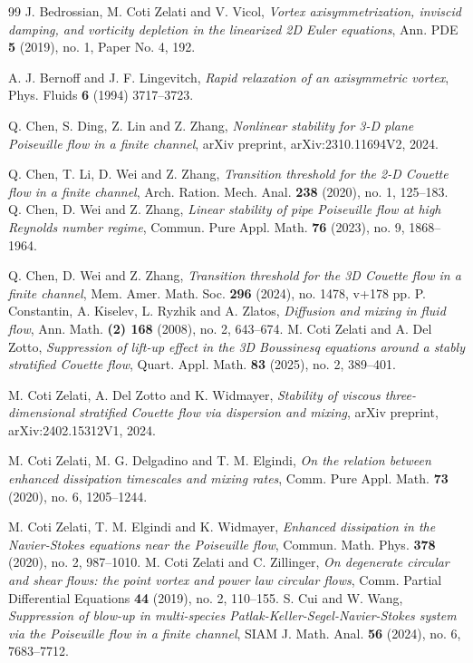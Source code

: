 \documentclass[reqno, 12pt]{amsart} %
\theoremstyle{plain} %
\theoremstyle{definition}
\theoremstyle{remark}
\numberwithin{equation}{section} %
\begin{document}
\begin{thebibliography}{99}
		J. Bedrossian, M. Coti Zelati and V. Vicol, 
		\textit{Vortex axisymmetrization, inviscid damping, and vorticity depletion in the linearized 2D Euler equations}, 
		Ann. PDE \textbf{5} (2019), no. 1, Paper No. 4, 192.
		
		A. J. Bernoff and J. F. Lingevitch, 
		\textit{Rapid relaxation of an axisymmetric vortex}, 
		Phys. Fluids \textbf{6} (1994) 3717–3723.
		
		Q. Chen, S. Ding, Z. Lin and Z. Zhang, 
		\textit{Nonlinear stability for 3-D plane Poiseuille flow in a finite channel}, 
		arXiv preprint, arXiv:2310.11694V2, 2024.
		
		Q. Chen, T. Li, D. Wei and Z. Zhang, 
		\textit{Transition threshold for the 2-D Couette flow in a finite channel}, 
		Arch. Ration. Mech. Anal. \textbf{238} (2020), no. 1, 125–183.
		Q. Chen, D. Wei and Z. Zhang, 
		\textit{Linear stability of pipe Poiseuille flow at high Reynolds number regime}, 
		Commun. Pure Appl. Math. \textbf{76}  (2023), no. 9, 1868–1964.
		
		Q. Chen, D. Wei and Z. Zhang, 
		\textit{Transition threshold for the 3D Couette flow in a finite channel}, 
		Mem. Amer. Math. Soc. \textbf{296} (2024), no. 1478, v+178 pp.
		P. Constantin, A. Kiselev, L. Ryzhik and A. Zlatos, 
		\textit{Diffusion and mixing in fluid flow}, 
		Ann. Math. \textbf{(2) 168} (2008), no. 2, 643–674. 
		M. Coti Zelati and A. Del Zotto, 
		\textit{Suppression of lift-up effect in the 3D Boussinesq equations around a stably stratified Couette flow}, 
		Quart. Appl. Math. \textbf{83} (2025), no. 2, 389–401.
		
		M. Coti Zelati, A. Del Zotto and K. Widmayer, 
		\textit{Stability of viscous three-dimensional stratified Couette flow via dispersion and mixing}, arXiv preprint, arXiv:2402.15312V1, 2024.
		
		M. Coti Zelati, M. G. Delgadino and T. M. Elgindi, 
		\textit{On the relation between enhanced dissipation timescales and mixing rates}, 
		Comm. Pure Appl. Math. \textbf{73} (2020), no. 6, 1205–1244.
		
		M. Coti Zelati, T. M. Elgindi and K. Widmayer, 
		\textit{Enhanced dissipation in the Navier-Stokes equations near the Poiseuille flow}, 
		Commun. Math. Phys. \textbf{378} (2020), no. 2, 987–1010.
		M. Coti Zelati and C. Zillinger, 
		\textit{On degenerate circular and shear flows: the point vortex and power law circular flows}, 
		Comm. Partial Differential Equations \textbf{44} (2019), no. 2, 110–155.
		S. Cui and W. Wang, 
		\textit{Suppression of blow-up in multi-species Patlak-Keller-Segel-Navier-Stokes system via the Poiseuille flow in a finite channel}, 
		SIAM J. Math. Anal. \textbf{56} (2024), no. 6, 7683–7712.
		

\end{thebibliography}
\end{document}
